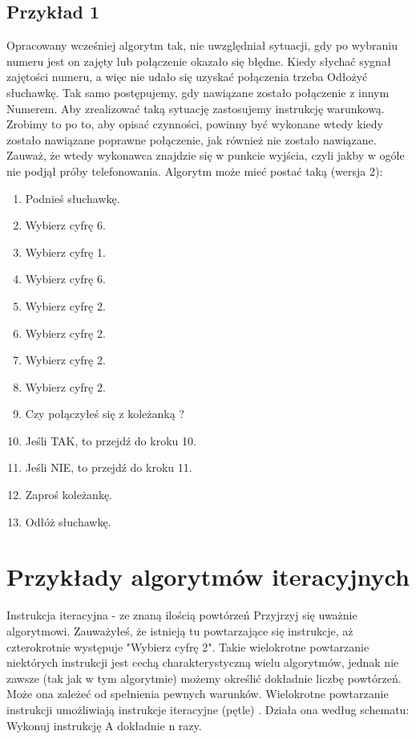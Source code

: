 \documentclass[a4paper,11pt]{article}
\begin{document}
\subsection{Przykład 1}
Opracowany wcześniej algorytm tak, nie uwzględniał sytuacji, gdy po wybraniu numeru 
jest on zajęty lub połączenie okazało się błędne. Kiedy słychać sygnał zajętości numeru, a 
więc nie udało się uzyskać połączenia trzeba Odłożyć słuchawkę. Tak samo postępujemy, 
gdy nawiązane zostało połączenie z innym Numerem. 
Aby zrealizować taką sytuację zastosujemy instrukcję warunkową. Zrobimy to po to, aby 
opisać czynności, powinny być wykonane wtedy kiedy zostało nawiązane poprawne 
połączenie, jak również nie zostało nawiązane. Zauważ, że wtedy wykonawca znajdzie się 
w punkcie wyjścia, czyli jakby w ogóle nie podjął próby telefonowania. 
Algorytm może mieć postać taką (wersja 2):
\begin{enumerate}
\item Podnieś słuchawkę. 
\item Wybierz cyfrę 6. 
\item Wybierz cyfrę 1. 
\item Wybierz cyfrę 6. 
\item Wybierz cyfrę 2. 
\item Wybierz cyfrę 2. 
\item Wybierz cyfrę 2. 
\item Wybierz cyfrę 2. 
\item Czy połączyłeś się z koleżanką ? 
\item Jeśli TAK, to przejdź do kroku 10. 
\item Jeśli NIE, to przejdź do kroku 11. 
\item Zaproś koleżankę. 
\item Odłóż słuchawkę. 
\end{enumerate}

\section{Przykłady algorytmów iteracyjnych} 
 
Instrukcja iteracyjna - ze znaną ilością powtórzeń 
Przyjrzyj się uważnie algorytmowi. Zauważyłeś, że istnieją tu 
powtarzające się instrukcje, aż czterokrotnie występuje "Wybierz 
cyfrę 2". 
Takie wielokrotne powtarzanie niektórych instrukcji jest cechą 
charakterystyczną wielu algorytmów, jednak nie zawsze (tak jak w 
tym algorytmie) możemy określić dokładnie liczbę powtórzeń. 
Może ona zależeć od spełnienia pewnych warunków. Wielokrotne 
powtarzanie instrukcji umożliwiają instrukcje iteracyjne (pętle) . 
Działa ona według schematu: 
Wykonuj instrukcję A dokładnie n razy.
\newpage
\end{document}
